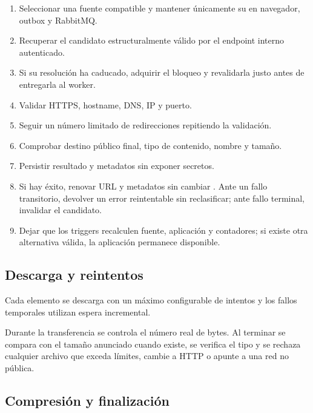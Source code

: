 \begin{enumerate}
	\item Seleccionar una fuente  compatible y mantener únicamente su  en navegador, outbox y RabbitMQ.
	\item Recuperar el candidato estructuralmente válido por el endpoint interno autenticado.
	\item Si su resolución ha caducado, adquirir el bloqueo y revalidarla justo antes de entregarla al worker.
	\item Validar HTTPS, hostname, DNS, IP y puerto.
	\item Seguir un número limitado de redirecciones repitiendo la validación.
	\item Comprobar destino público final, tipo de contenido, nombre y tamaño.
	\item Persistir resultado y metadatos sin exponer secretos.
	\item Si hay éxito, renovar URL y metadatos sin cambiar . Ante un fallo transitorio, devolver un error reintentable sin reclasificar; ante fallo terminal, invalidar el candidato.
	\item Dejar que los triggers recalculen fuente, aplicación y contadores; si existe otra alternativa válida, la aplicación permanece disponible.
\end{enumerate}

\subsection{Descarga y reintentos}

Cada elemento se descarga con un máximo configurable de intentos y los fallos temporales utilizan espera incremental.

Durante la transferencia se controla el número real de bytes. Al terminar se compara con el tamaño anunciado cuando existe, se verifica el tipo y se rechaza cualquier archivo que exceda límites, cambie a HTTP o apunte a una red no pública.

\subsection{Compresión y finalización}

